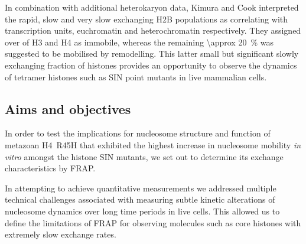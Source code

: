     In combination with additional heterokaryon data, Kimura and Cook
    interpreted the rapid, slow and very slow exchanging H2B
    populations as correlating with transcription units, euchromatin
    and heterochromatin respectively.  They assigned over 
    of H3 and H4 as immobile, whereas the remaining
    \SI{\approx 20}{\percent} was suggested to be mobilised by
    remodelling.  This latter small but significant
    slowly exchanging fraction of histones
    provides an opportunity to observe the dynamics of
    tetramer histones such as SIN point mutants in live mammalian cells.


  \subsection{Aims and objectives}

    In order to test the implications for nucleosome structure and function
    of metazoan H4~R45H that exhibited the highest increase
    in nucleosome mobility \textit{in vitro} amongst the histone SIN mutants,
    we set out to determine its exchange characteristics by FRAP.

    In attempting to achieve quantitative measurements
    we addressed multiple technical challenges associated with
    measuring subtle kinetic alterations of nucleosome dynamics
    over long time periods in live cells.
    This allowed us to define the limitations of FRAP for observing molecules
    such as core histones with extremely slow exchange rates.
